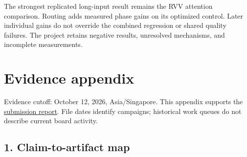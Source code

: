 \documentclass[10pt,a4paper]{article}
\begin{document}
The strongest replicated long-input result remains the RVV attention
comparison. Routing adds measured phase gains on its optimized control.
Later individual gains do not override the combined regression or shared
quality failures. The project retains negative results, unresolved
mechanisms, and incomplete measurements.

\clearpage

\hypertarget{evidence-appendix}{%
\section{Evidence appendix}\label{evidence-appendix}}

Evidence cutoff: October 12, 2026, Asia/Singapore. This appendix
supports the
\href{https://github.com/MoyaMryia/riscv-accl/blob/main/spacemit/reports/SUBMISSION-REPORT.md}{submission
report}. File dates identify campaigns; historical work queues do not
describe current board activity.

\hypertarget{claim-to-artifact-map}{%
\subsection{1. Claim-to-artifact map}\label{claim-to-artifact-map}}
\end{document}
